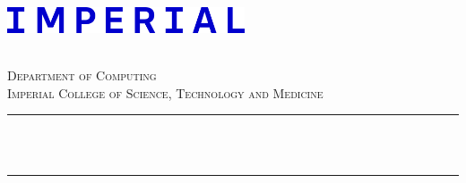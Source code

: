 
\begin{titlepage}

\newcommand{\HRule}{\rule{\linewidth}{0.5mm}} %


\includegraphics[width = 7cm]{./title/figures/imperial3.png}\\[0.25cm] 

\center %
 

\textsc{\LARGE \reporttype}\\[0.5cm] 
\textsc{\Large Department of Computing}\\[0.5cm] 
\textsc{\large Imperial College of Science, Technology and Medicine}\\[0.5cm] 


\HRule \\[0.4cm]
{ \huge \bfseries \reporttitle}\\ %
\HRule \\[0.5cm]
 


\end{titlepage}
